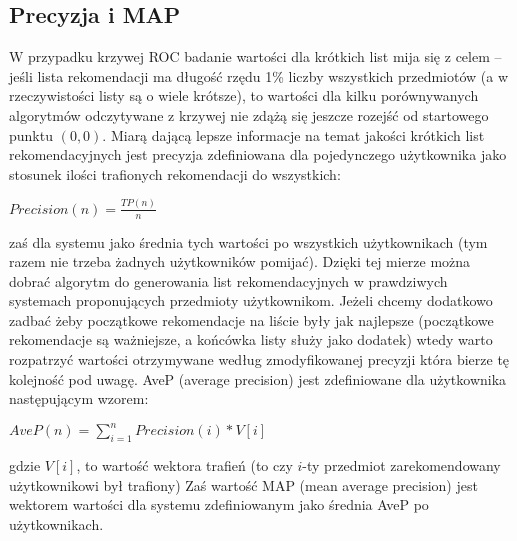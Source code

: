 \documentclass{pracamgr}
\begin{document}
   \subsection{Precyzja i MAP}
    W przypadku krzywej ROC badanie wartości dla krótkich list mija się z celem -- jeśli lista rekomendacji ma długość rzędu 1\% liczby wszystkich przedmiotów
    (a w rzeczywistości listy są o wiele krótsze), to wartości dla kilku porównywanych algorytmów odczytywane
    z krzywej nie zdążą się jeszcze rozejść od startowego punktu $(0,0)$.\newline
    Miarą dającą lepsze informacje na temat jakości krótkich list rekomendacyjnych jest
    precyzja zdefiniowana dla pojedynczego użytkownika jako stosunek ilości trafionych rekomendacji do wszystkich:
    \begin{center}
     $Precision(n)=\frac{TP(n)}{n}$
    \end{center}
    zaś dla systemu jako średnia tych wartości po wszystkich użytkownikach (tym razem nie trzeba żadnych użytkowników pomijać).\newline
    Dzięki tej mierze można dobrać algorytm do generowania list rekomendacyjnych w prawdziwych systemach proponujących przedmioty użytkownikom.
    Jeżeli chcemy dodatkowo zadbać żeby początkowe rekomendacje na liście były jak najlepsze
    (początkowe rekomendacje są ważniejsze, a końcówka listy służy jako dodatek) wtedy warto rozpatrzyć wartości otrzymywane według zmodyfikowanej precyzji
    która bierze tę kolejność pod uwagę.
    AveP (average precision) jest zdefiniowane dla użytkownika następującym wzorem:
    \begin{center}
     $AveP(n)=\sum\limits_{i=1}^{n}Precision(i)*V[i]$
    \end{center} 
    {\scriptsize
     gdzie $V[i]$, to wartość wektora trafień (to czy $i$-ty przedmiot zarekomendowany użytkownikowi był trafiony)
    }\newline
    Zaś wartość MAP (mean average precision) jest wektorem wartości dla systemu zdefiniowanym jako średnia AveP po użytkownikach.
\end{document}
